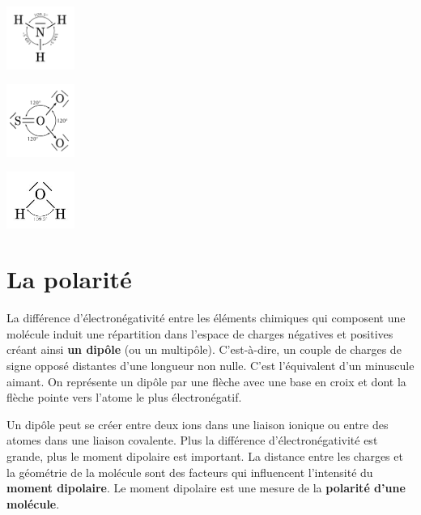 \documentclass[
  11pt,
  a4paper,
  openany]{book}
\begin{document}
\begin{Answer}

\begin{multicols}{3}
\includegraphics[width=6em,height=\textheight]{exe/molecules-10-NH3.png}

\includegraphics[width=6em,height=\textheight]{exe/molecules-10-SO3.png}

\includegraphics[width=6em,height=\textheight]{exe/molecules-10-H2O.png}

\end{multicols}

\end{Answer}

\newpage

\hypertarget{la-polarituxe9}{%
\section{La polarité}\label{la-polarituxe9}}

La différence d'électronégativité entre les éléments chimiques qui composent une molécule induit une répartition dans l'espace de charges négatives et positives créant ainsi \textbf{un dipôle} (ou un multipôle). C'est-à-dire, un couple de charges de signe opposé distantes d'une longueur non nulle. C'est l'équivalent d'un minuscule aimant. On représente un dipôle par une flèche avec une base en croix et dont la flèche pointe vers l'atome le plus électronégatif.

Un dipôle peut se créer entre deux ions dans une liaison ionique ou entre des atomes dans une liaison covalente. Plus la différence d'électronégativité est grande, plus le moment dipolaire est important. La distance entre les charges et la géométrie de la molécule sont des facteurs qui influencent l'intensité du \textbf{moment dipolaire}. Le moment dipolaire est une mesure de la \textbf{polarité d'une molécule}.
\end{document}
